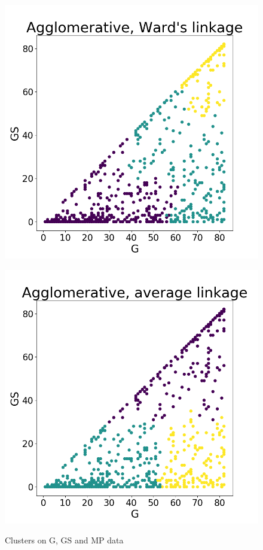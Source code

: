 \documentclass[a4paper]{article}
\begin{document}
\begin{figure}
\begin{minipage}{.22\textwidth}
  \label{fig:complete_g_gs_mp}
\end{minipage}
\begin{minipage}{.22\textwidth}
  \centering
  \includegraphics[scale=0.14]{ward_link_g_gs_mp.png}
  \label{fig:ward_g_gs_mp}
\end{minipage}
\begin{minipage}{.22\textwidth}
  \centering
  \includegraphics[scale=0.14]{average_link_g_gs_mp.png}
  \label{fig:average_g_gs_mp}
\end{minipage}
\caption{Clusters on G, GS and MP data}
\label{plt:clust_g_gs_mp_k3}
\end{figure}
\end{document}
